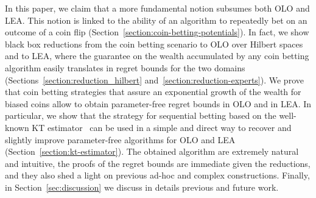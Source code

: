 In this paper, we claim that a more fundamental notion subsumes both \ac{OLO}
and \ac{LEA}. This notion is linked to the ability of an algorithm to repeatedly
bet on an outcome of a coin flip
(Section~\ref{section:coin-betting-potentials}). In fact, we show black box
reductions from the coin betting scenario to \ac{OLO} over Hilbert spaces and to
\ac{LEA}, where the guarantee on the wealth accumulated by any coin betting
algorithm easily translates in regret bounds for the two domains
(Sections~\ref{section:reduction_hilbert} and~\ref{section:reduction-experts}).
We prove that coin betting strategies that assure an exponential growth of the
wealth for biased coins allow to obtain parameter-free regret bounds in \ac{OLO}
and in \ac{LEA}. In particular, we show that the strategy for sequential betting
based on the well-known \ac{KT} estimator~\citep{KrichevskyT81} can be used in a
simple and direct way to recover and slightly improve parameter-free algorithms
for \ac{OLO} and \ac{LEA} (Section~\ref{section:kt-estimator}). The obtained
algorithm are extremely natural and intuitive, the proofs of the regret bounds
are immediate given the reductions, and they also shed a light on previous
ad-hoc and complex constructions. Finally, in Section~\ref{sec:discussion} we discuss in details previous and future work.

